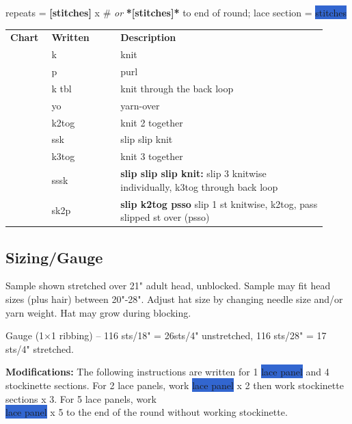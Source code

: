 \documentclass[12pt]{article}
\renewcommand{\arraystretch}{2}
\newcommand{\x}{$\times$}
\newcommand{\highlighted}[1]{\colorbox{highlight}{#1}}
\newenvironment{frnote}
    {%
    	\setlength{\FrameRule}{1.5pt}
    	\def\FrameCommand{\fboxrule=\FrameRule\fboxsep=\FrameSep \fcolorbox{framecolor}{shadecolor}}
    	\MakeFramed {\FrameRestore}}
    {\endMakeFramed
	\setlength{\FrameRule}{1pt}}
\begin{document}
\begin{titlingpage}
\begin{multicols}{2}
repeats = \textbf{[stitches]} x \# \emph{or} \textbf{*[stitches]*} to end of round; 
lace section = \highlighted{stitches}
\vspace{-1em}
\begin{center}
{\renewcommand{\arraystretch}{1.5}
\begin{tabular}{| C{0.12\linewidth}  C{0.2\linewidth}  p{0.6\linewidth} | }
\thickhline {} 
\textbf{Chart}	& \textbf{Written}	& \textbf{Description} \\ \thickhline
\chart{-}	& k	&  knit \\
\chart{=} 	& p	& purl   \\
	& k tbl	& knit through the back loop \\
 	& yo		& yarn-over  \\
\chart{>}	& k2tog 	& knit 2 together \\
\chart{<}	& ssk		& slip slip knit \\
	& k3tog 	& knit 3 together \\
	& sssk		& \textbf{slip slip slip knit:} slip 3 knitwise individually, k3tog through back loop\\
 	& sk2p	& \textbf{slip k2tog psso} slip 1 st knitwise, k2tog, pass slipped st over (psso)\\
\hline
\end{tabular}
}
\end{center}
\end{multicols}


\subsection*{Sizing/Gauge}

Sample shown stretched over 21" adult head, unblocked. Sample may fit head sizes (plus hair) between 20"-28".
Adjust hat size by changing needle size and/or yarn weight. Hat may grow during blocking.

Gauge (1\x1 ribbing) -- 116 sts/18" = 26sts/4" unstretched,
116 sts/28" = 17 sts/4" stretched. 

\begin{frnote}
\small
\textbf{Modifications:} The following instructions are written for 1 \highlighted{lace panel} and 4 stockinette sections. For 2 lace panels, work \highlighted{lace panel} x 2 then work stockinette sections x 3. For 5 lace panels, work \\\highlighted{lace panel} x 5 to the end of the round without working stockinette.
\end{frnote}


\end{titlingpage}
\end{document}
